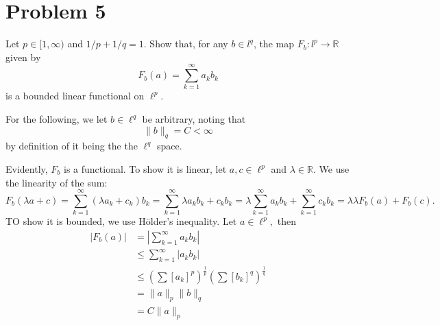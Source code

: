 \documentclass[11pt]{article}
\newcommand{\bbR}{\mathbb{R}}
\begin{document}
\section*{Problem 5}
\begin{problem}
Let \( p \in [1, \infty) \) and \( 1/p + 1/q = 1 \). Show that, for any \( b \in l^q \), the map \( F_b : l^p \to \mathbb{R} \) given by \[F_b(a) = \sum_{k=1}^\infty a_k b_k \] is a bounded linear functional on \( \ell^p \).
\end{problem}
\begin{solution}
For the following, we let $b\in \ell^q$ be arbitrary, noting that 
\[\|b\|_q = C  <\infty\] by definition of it being the the $\ell^q$ space.

    Evidently, $F_b$ is a functional. To show it is linear, let $a, c \in \ell^p$ and $\lambda \in \bbR.$ We use the linearity of the sum:
    \[F_b(\lambda a  + c) = \sum_{k=1}^\infty (\lambda a_k + c_k)b_k = \sum_{k=1}^\infty \lambda a_kb_k + c_kb_k = \lambda \sum_{k=1}^\infty a_kb_k + \sum_{k=1}^\infty c_kb_k = \lambda \lambda F_b(a) + F_b(c).\] TO show it is bounded, we use H\"{o}lder's inequality. Let $a \in \ell^p,$ then 
    \begin{align*}
        |F_b(a)| &= |\sum_{k=1}^\infty a_k b_k|\\
        &\leq \sum_{k=1}^\infty |a_k b_k|\\
        &\leq \left(\sum [a_k]^{p}\right)^\frac{1}{p}\left(\sum [b_k]^{q}\right)^\frac{1}{q}\\
        &= \|a\|_p\|b\|_q\\
        &= C\|a\|_p
    \end{align*}
\end{solution}
\end{document}
